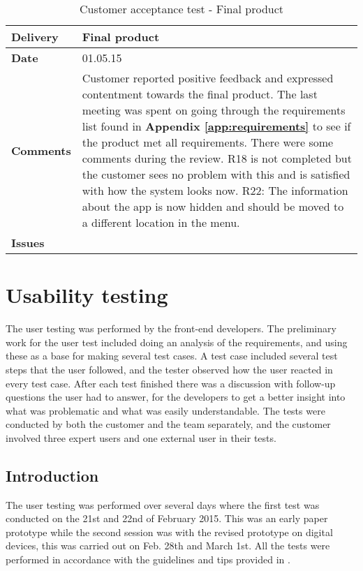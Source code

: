 \renewcommand{\arraystretch}{2}%
\begin{center}
	\begin{longtable}{ | p{4cm} | p{13cm} | }
		
		\caption[Customer acceptance test - Final product]{Customer acceptance test - Final product} \label{Tab:cattest5}\\
		\hline
		\textbf{Delivery} & Final product\\ \hline
		\textbf{Date} & 01.05.15 \\ \hline
		\textbf{Comments} & Customer reported positive feedback and expressed contentment towards the final product.  The last meeting was spent on going through the requirements list found in \textbf{Appendix \ref{app:requirements}} to see if the product met all requirements. There were some comments during the review. 
		R18 is not completed but the customer sees no problem with this and is satisfied with how the system looks now. 
		R22: The information about the app is now hidden and should be moved to a different location in the menu.   \\ \hline
		\textbf{Issues} \\ \hline
	\end{longtable}
\end{center}

\section{Usability testing}

The user testing was performed by the front-end developers. The preliminary work for the user test included doing an analysis of the requirements, and using these as a base for making several test cases. 
A test case included several test steps that the user followed, and the tester observed how the user reacted in every test case. After each test finished there was a discussion with follow-up questions the user had to answer, for the developers to get a better insight into what was problematic and what was easily understandable. The tests were conducted by both the customer and the team separately, and the customer involved three expert users and one external user in their tests.

\subsection{Introduction}
The user testing was performed over several days where the first test was conducted on the 21st and 22nd of February 2015. This was an early paper prototype while the second session was with the revised prototype on digital devices\cite{protoIO}, this was carried out on Feb. 28th and March 1st. All the tests were performed in accordance with the guidelines and tips provided in \cite{norman2007designing}.

